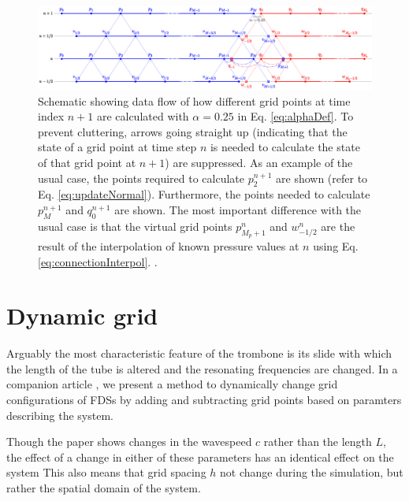 \begin{figure}[t]
    \centering
    \includegraphics[width = \textwidth]{Figures/tromboneSchematic.eps}
    \caption{Schematic showing data flow of how different grid points at time index $n+1$ are calculated with $\alpha = 0.25$ in Eq. \eqref{eq:alphaDef}. To prevent cluttering, arrows going straight up (indicating that the state of a grid point at time step $n$ is needed to calculate the state of that grid point at $n+1$) are suppressed. As an example of the usual case, the points required to calculate $p_2^{n+1}$ are shown (refer to Eq. \eqref{eq:updateNormal}). Furthermore, the points needed to calculate $p_{M}^{n+1}$ and $q_0^{n+1}$ are shown. The most important difference with the usual case is that the virtual grid points $p_{M_p+1}^n$ and $w_{-1/2}^n$ 
    are the result of the interpolation of known pressure values at $n$ using Eq. \eqref{eq:connectionInterpol}. %
    .
    \label{fig:dynamicGridSchematic}}
\end{figure}

\section{Dynamic grid}\label{sec:dynamicGrid}
Arguably the most characteristic feature of the trombone is its slide with which the length of the tube is altered and the resonating frequencies are changed. In a companion article \cite{Willemsen2021}, we present a method to dynamically change grid configurations of FDSs by adding and subtracting grid points based on paramters describing the system.

Though the paper shows changes in the wavespeed $c$ rather than the length $L$, the effect of a change in either of these parameters has an identical effect on the system  This also means that grid spacing $h$ not change during the simulation, but rather the spatial domain of the system.

